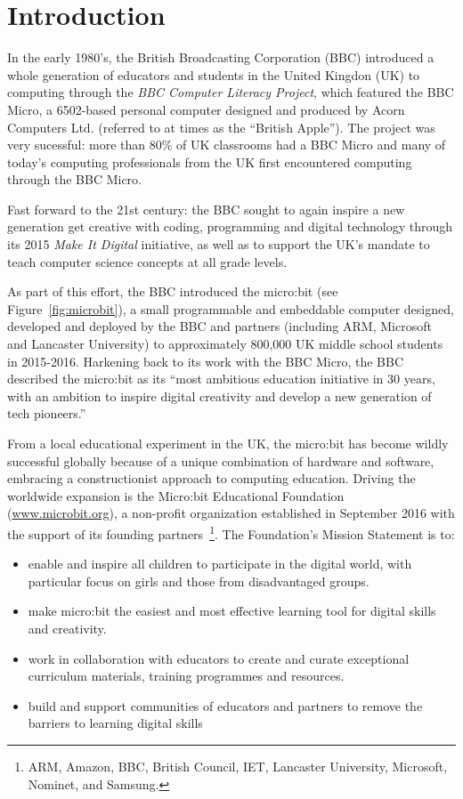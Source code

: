 \section{Introduction}
\label{sec:intrp}

In the early 1980's, the British Broadcasting Corporation (BBC)
introduced a whole generation of educators and students in the United Kingdon (UK) 
to computing through the {\em BBC Computer Literacy Project}, which featured the BBC Micro, 
a 6502-based personal computer designed and produced by Acorn Computers Ltd. (referred
to at times as the ``British Apple'').  The project was very sucessful:
more than 80\% of UK classrooms had a BBC Micro and many of today's 
computing professionals from the UK first encountered computing through
the BBC Micro.

Fast forward to the 21st century: the BBC sought to again inspire a new
generation get creative with coding, programming and digital technology
through its 2015 {\em Make It Digital} initiative, as well as to support the UK's mandate to 
teach computer science concepts at all grade levels.~\cite{PeytonJones2013ICFP}

As part of this effort, the BBC introduced the micro:bit (see 
Figure~\ref{fig:microbit}),
a small programmable and embeddable computer designed, 
developed and deployed by the BBC and partners (including ARM, Microsoft
and Lancaster University) to approximately 800,000 UK middle school students
in 2015-2016. Harkening back to its work with the BBC Micro,
the BBC described the micro:bit as its ``most ambitious education initiative in 30 years, 
with an ambition to inspire digital creativity and 
develop a new generation of tech pioneers.''~\cite{BBCwebsite}

From a local educational experiment in the UK, the micro:bit has become
wildly successful globally because of a unique combination of hardware and
software, embracing a constructionist approach to computing education.
Driving the worldwide expansion is
the Micro:bit Educational Foundation (\url{www.microbit.org}),
a non-profit organization
established in September 2016 with the support of its founding partners~\footnote{ARM,
Amazon, BBC, British Council, IET, Lancaster University, Microsoft,
Nominet, and Samsung.}. 
The Foundation's Mission Statement is to: 
\begin{itemize}
\item  enable and inspire all children to participate in the digital world, 
with particular focus on girls and those from disadvantaged groups.
\item make micro:bit the easiest and most effective learning tool for digital skills and creativity.
\item work in collaboration with educators to create and curate exceptional 
curriculum materials, training programmes and resources.
\item build and support communities of educators and partners 
to remove the barriers to learning digital skills
\end{itemize}


